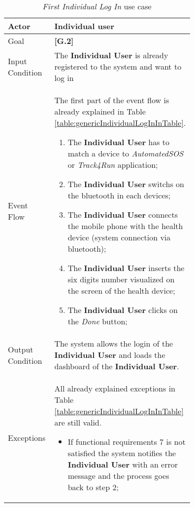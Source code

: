 \begin{center}
\begin{table}
\begin{tabular}{ | l | p{0.75\linewidth} | }
  \hline
    Actor & \textbf{Individual user} \\ \hline
    Goal & \textbf{[G.2]} \\ \hline
    Input Condition & The \textbf{Individual User} is already registered to the system and want to log in \\ \hline
    Event Flow & \begin{minipage}[t]{0.7\textwidth}
      The first part of the event flow is already explained in Table \ref{table:genericIndividualLogInInTable}.
      \smallskip
      \begin{enumerate}
        \item The \textbf{Individual User} has to match a device to \textit{AutomatedSOS} or \textit{Track4Run} application;
        \item The \textbf{Individual User} switchs on the bluetooth in each devices;
        \item The \textbf{Individual User} connects the mobile phone with the health device (system connection via bluetooth);
        \item The \textbf{Individual User} inserts the six digits number visualized on the screen of the health device;
        \item The \textbf{Individual User} clicks on the \textit{Done} button;
      \end{enumerate}
    \smallskip
  \end{minipage} \\ \hline
  Output Condition & The system allows the login of the \textbf{Individual User} and loads the dashboard of the \textbf{Individual User}. \\ \hline
  Exceptions & \begin{minipage}[t]{0.7\textwidth}
    All already explained exceptions in Table \ref{table:genericIndividualLogInInTable} are still valid.
    \begin{itemize}
      \smallskip
      \item If functional requirements 7 is not satisfied the system notifies the \textbf{Individual User} with an error message and the process goes back to step 2;
    \end{itemize}
    \smallskip
  \end{minipage}  \\ \hline
\end{tabular}
\caption{\textit{First Individual Log In} use case}
\label{table:firstIndividualLogInInTable}
\end{table}
\end{center}
